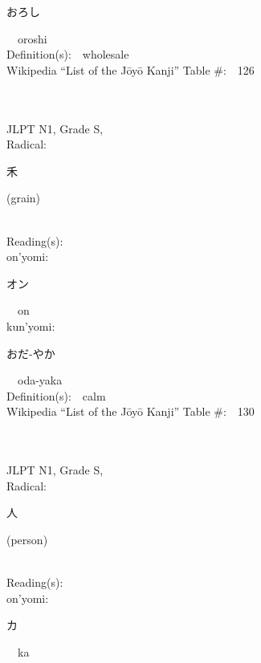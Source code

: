 \begin{multicols}{2}
{\hspace*{2em}}{\begin{CJK}{UTF8}{min} おろし \end{CJK}}\ \ oroshi\ \ \\
Definition(s):\ \ wholesale \\
Wikipedia ``List of the J\=oy\=o Kanji'' Table \#:\ \ 126 \\
\ \ \\
{\fontsize{34pt}{40pt}  }\ \ \\
{JLPT N1, Grade S, \\Radical:\ \ {\begin{CJK}{UTF8}{min} 禾 \end{CJK}} (grain) } \\
Reading(s):\ \ \\
{\hspace*{1em}}on'yomi:\ \ \\
{\hspace*{2em}}{\begin{CJK}{UTF8}{min} オン \end{CJK}}\ \ on\ \ \\
{\hspace*{1em}}kun'yomi:\ \ \\
{\hspace*{2em}}{\begin{CJK}{UTF8}{min} おだ-やか \end{CJK}}\ \ oda-yaka\ \ \\
Definition(s):\ \ calm \\
Wikipedia ``List of the J\=oy\=o Kanji'' Table \#:\ \ 130 \\
\ \ \\
{\fontsize{34pt}{40pt}  }\ \ \\
{JLPT N1, Grade S, \\Radical:\ \ {\begin{CJK}{UTF8}{min} 人 \end{CJK}} (person) } \\
Reading(s):\ \ \\
{\hspace*{1em}}on'yomi:\ \ \\
{\hspace*{2em}}{\begin{CJK}{UTF8}{min} カ \end{CJK}}\ \ ka\ \ \\

\end{multicols}
